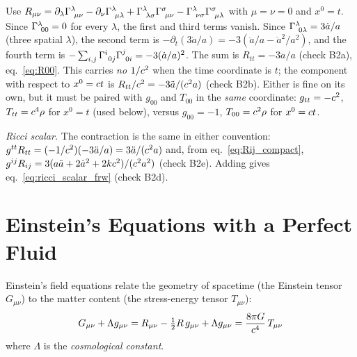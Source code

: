 \begin{derivation}
Use $R_{\mu\nu} = \partial_\lambda\Gamma^{\lambda}_{\ \mu \nu}
- \partial_\nu\Gamma^{\lambda}_{\ \mu \lambda}
+ \Gamma^{\lambda}_{\ \lambda \sigma}\Gamma^{\sigma}_{\ \mu \nu}
- \Gamma^{\lambda}_{\ \nu \sigma}\Gamma^{\sigma}_{\ \mu \lambda}$
with $\mu = \nu = 0$ and $x^0 = t$.  Since
$\Gamma^{\lambda}_{\ 0 0} = 0$ for every $\lambda$, the first and
third terms vanish.  Since $\Gamma^{\lambda}_{\ 0 \lambda} = 3\dot a/a$
(three spatial $\lambda$), the second term is
$-\partial_t(3\dot a/a) = -3(\ddot a/a - \dot a^2/a^2)$, and the fourth
term is $-\sum_{i,j}\Gamma^{i}_{\ 0 j}\Gamma^{j}_{\ 0 i}
= -3(\dot a/a)^2$.  The sum is $R_{tt} = -3\ddot a/a$ (check B2a),
eq.~\eqref{eq:R00}.  This carries
\emph{no} $1/c^2$ when the time coordinate is $t$; the component
with respect to $x^0 = c t$ is $R_{tt}/c^2 =
-3\ddot a/(c^2 a)$ (check B2b).
Either is fine on its own, but it must be paired with $g_{00}$ and $T_{00}$ in
the \emph{same} coordinate: $g_{tt} = -c^2$, $T_{tt} =
c^4\rho$ for $x^0 = t$ (used below), versus $g_{00} = -1$,
$T_{00} = c^2\rho$ for $x^0 = c t$.

\textit{Ricci scalar.}  The contraction is the same in either convention:
$g^{tt}R_{tt} = (-1/c^2)(-3\ddot a/a) = 3\ddot a/(c^2 a)$
and, from eq.~\eqref{eq:Rij_compact}, $g^{ij}R_{ij} = 3(a\ddot a + 2\dot a^2 +
2kc^2)/(c^2 a^2)$ (check B2e).  Adding gives
eq.~\eqref{eq:ricci_scalar_frw} (check B2d).
\end{derivation}

\section{Einstein's Equations with a Perfect Fluid}
\label{sec:einstein_perfect_fluid}

Einstein's field equations relate the geometry of spacetime (the
Einstein tensor $G_{\mu\nu}$) to the matter content (the stress-energy
tensor $T_{\mu\nu}$):
\begin{equation}
    G_{\mu\nu} + \Lambda g_{\mu\nu}
    = R_{\mu\nu} - \tfrac{1}{2} R\, g_{\mu\nu} + \Lambda g_{\mu\nu}
    = \frac{8\pi G}{c^4}\, T_{\mu\nu}
    \label{eq:einstein_field_frw}
\end{equation}
where $\Lambda$ is the \emph{cosmological constant}.

